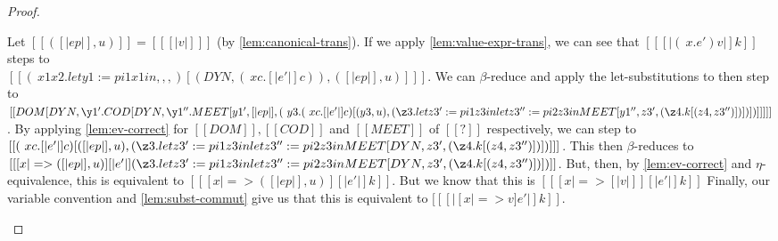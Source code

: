 \documentclass[11pt]{article}
\begin{document}
\begin{proof}
\begin{itemize}
		Let $[[( [|ep|], u)]] = [[ [|v|] ]]$ (by \autoref{lem:canonical-trans}).
        If we apply \autoref{lem:value-expr-trans}, we can see that $[[ [|(\ x  . e') v|]k ]]$
        steps to \\$[[ (\ x1  x2. let y1 := pi1 x1 in ,,,)[(DYN, (\ x c . [|e'|]c )), ( [|ep|], u) ]  ]]$.
        We can $\beta$-reduce and apply the let-substitutions to then step to
        \\$[[ DOM [DYN, \y1' . COD [ DYN, \y1''. MEET [y1', [|ep|], (\ y3 . (\ x c . [|e'|]c ) [(y3, u), (\z3 . let z3' := pi1 z3 in let z3'' := pi2 z3 in MEET[y1'', z3', (\z4. k[(z4, z3'')] ) ] ) ] )] ] ] ]]$.
        By applying \autoref{lem:ev-correct} for $[[DOM]], [[COD]]$ and $[[MEET]]$ of $[[?]]$ respectively,
        we can step to  
        \\$[[  (\ x c . [|e'|]c ) [([|ep|], u), (\z3 . let z3' := pi1 z3 in let z3'' := pi2 z3 in MEET[DYN, z3', (\z4. k[(z4, z3'')] ) ] ) ] ]]$.
		This then $\beta$-reduces to 
		\\$[[  [ x |=> ([|ep|], u) ][|e'|](\z3 . let z3' := pi1 z3 in let z3'' := pi2 z3 in MEET[DYN, z3', (\z4. k[(z4, z3'')] ) ] ) ]]$.
		But, then, by \autoref{lem:ev-correct} and $\eta$-equivalence, this is equivalent to
		$[[  [ x |=> ([|ep|], u) ][|e'|]k  ]]$.
		But we know that this is $[[  [ x |=> [|v|] ][|e'|]k  ]]$ 
		Finally, our variable convention and \autoref{lem:subst-commut} give us that 
		this is equivalent to $[[ [| [x |=> v]e' |]k  ]]$.


\end{itemize}
\end{proof}
\end{document}
